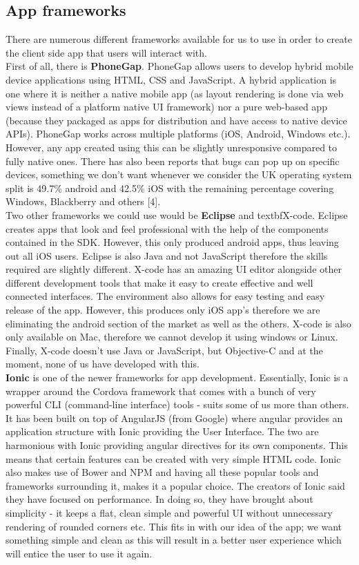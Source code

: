 \subsection{App frameworks}
There are numerous different frameworks available for us to use in order to create the client side app that users will interact with.  \\
First of all, there is \textbf{PhoneGap}.  PhoneGap allows users to develop hybrid mobile device applications using HTML, CSS and JavaScript.  A hybrid application is one where it is neither a native mobile app (as layout rendering is done via web views instead of a platform native UI framework) nor a pure web-based app (because they packaged as apps for distribution and have access to native device APIs).  PhoneGap works across multiple platforms (iOS, Android, Windows etc.).  However, any app created using this can be slightly unresponsive compared to fully native ones.  There has also been reports that bugs can pop up on specific devices, something we don't want whenever we consider the UK operating system split is 49.7\% android and 42.5\% iOS with the remaining percentage covering Windows, Blackberry and others [4].   \\
Two other frameworks we could use would be \textbf{Eclipse} and textbf{X-code}.  Eclipse creates apps that look and feel professional with the help of the components contained in the SDK.   However, this only produced android apps, thus leaving out all iOS users.  Eclipse is also Java and not JavaScript therefore the skills required are slightly different.    X-code has an amazing UI editor alongside other different development tools that make it easy to create effective and well connected interfaces.  The environment also allows for easy testing and easy release of the app.  However, this produces only iOS app's therefore we are eliminating the android section of the market as well as the others.  X-code is also only available on Mac, therefore we cannot develop it using windows or Linux.  Finally, X-code doesn't use Java or JavaScript, but Objective-C and at the moment, none of us have developed with this.  \\
\textbf{Ionic} is one of the newer frameworks for app development.  Essentially, Ionic is a wrapper around the Cordova framework that comes with a bunch of very powerful CLI (command-line interface) tools - suits some of us more than others.  It has been built on top of AngularJS (from Google) where angular provides an application structure with Ionic providing the User Interface.  The two are harmonious with Ionic providing angular directives for its own components.  This means that certain features can be created with very simple HTML code.  Ionic also makes use of Bower and NPM and having all these popular tools and frameworks surrounding it, makes it a popular choice.  The creators of Ionic said they have focused on performance.  In doing so, they have brought about simplicity - it keeps a flat, clean simple and powerful UI without unnecessary rendering of rounded corners etc.  This fits in with our idea of the app; we want something simple and clean as this will result in a better user experience which will entice the user to use it again.  

